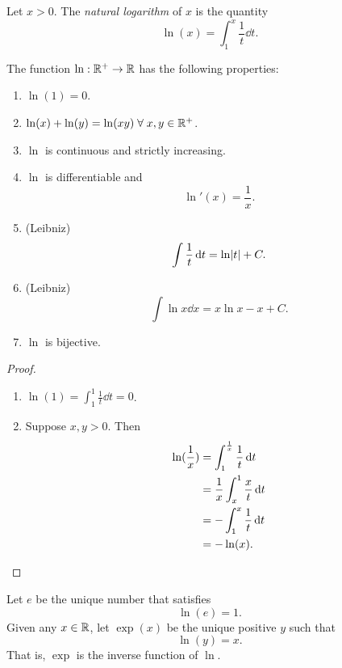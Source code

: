 \begin{defn} \label{defn:ln}
    Let $x > 0$. The \emph{natural logarithm} of $x$ is the quantity \[
        \ln(x) = \int_{1}^{x} \frac{1}{t} \dd t.
    \]
\end{defn}

\begin{thm}[] \label{thm:}
    The function $\ln : \mathbb{R}^{+} \to \mathbb{R}$ has the following properties:
    \begin{enumerate}[label=(\alph*)]
        \item $\ln(1) = 0$.
        \item $\ln(x) + \ln(y) = \ln(xy) \;\forall\; x, y \in \mathbb{R}^{+}$.
        \item $\ln$ is continuous and strictly increasing.
        \item $\ln$ is differentiable and \[
            \ln'(x) = \frac{1}{x}.
        \]
        \item (Leibniz) \[
            \int \frac{1}{t} \dd t = \ln \abs{t} + C.
        \]
        \item (Leibniz) \[
            \int \ln x \dd x = x \ln x - x + C.
        \]
        \item $\ln$ is bijective.
    \end{enumerate}
\end{thm}
\begin{proof} \leavevmode
    \begin{enumerate}[label=(\alph*)]
        \item $\ln(1) = \int_{1}^{1} \frac{1}{t} \dd t = 0$.
        \item Suppose $x, y > 0$. Then
        \begin{align*}
            \ln(\frac{1}{x}) &= \int_{1}^{\frac{1}{x}} \frac{1}{t} \,\mathrm{d} t \\
            &= \frac{1}{x} \int_{x}^{1} \frac{x}{t} \,\mathrm{d} t \\
            &= - \int_{1}^{x} \frac{1}{t} \,\mathrm{d} t \\
            &= - \ln(x). \qedhere
        \end{align*}
    \end{enumerate}
\end{proof}

\begin{defn}[e \& Exponentiation] \label{defn:e}
    Let $e$ be the unique number that satisfies \[
        \ln(e) = 1.
    \] Given any $x \in \mathbb{R}$, let $\exp(x)$ be the unique positive $y$ such that \[
        \ln(y) = x.
    \] That is, $\exp$ is the inverse function of $\ln$.
\end{defn}

